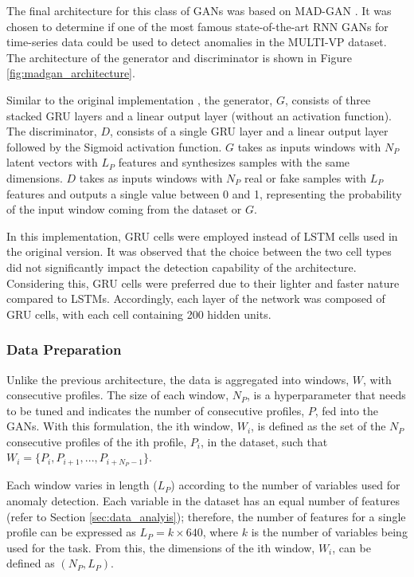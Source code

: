 The final architecture for this class of GANs was based on MAD-GAN \cite{li.etal_MADGANMultivariateAnomaly_2019}. It was chosen to determine if one of the most famous state-of-the-art RNN GANs for time-series data could be used to detect anomalies in the MULTI-VP dataset. The architecture of the generator and discriminator is shown in Figure \ref{fig:madgan_architecture}.

Similar to the original implementation \cite{li.etal_MADGANMultivariateAnomaly_2019}, the generator, $G$, consists of three stacked GRU layers and a linear output layer (without an activation function). The discriminator, $D$, consists of a single GRU layer and a linear output layer followed by the Sigmoid activation function. $G$ takes as inputs windows with $N_P$ latent vectors with $L_P$ features and synthesizes samples with the same dimensions. $D$ takes as inputs windows with $N_P$ real or fake samples with $L_P$ features and outputs a single value between 0 and 1, representing the probability of the input window coming from the dataset or $G$. 

In this implementation, GRU cells were employed instead of LSTM cells used in the original version. It was observed that the choice between the two cell types did not significantly impact the detection capability of the architecture. Considering this, GRU cells were preferred due to their lighter and faster nature compared to LSTMs. Accordingly, each layer of the network was composed of GRU cells, with each cell containing 200 hidden units.

\subsubsection*{Data Preparation}
Unlike the previous architecture, the data is aggregated into windows, $W$, with consecutive profiles. The size of each window, $N_P$, is a hyperparameter that needs to be tuned and indicates the number of consecutive profiles, $P$, fed into the GANs. With this formulation, the ith window, $W_i$, is defined as the set of the $N_P$ consecutive profiles of the ith profile, $P_i$, in the dataset, such that $W_i = \{P_i, P_{i+1}, ..., P_{i+N_P-1}\}$.

Each window varies in length ($L_P$) according to the number of variables used for anomaly detection. Each variable in the dataset has an equal number of features (refer to Section \ref{sec:data_analyis}); therefore, the number of features for a single profile can be expressed as $L_P=k\times 640$, where $k$ is the number of variables being used for the task. From this, the dimensions of the ith window, $W_i$, can be defined as $(N_P, L_P)$.

